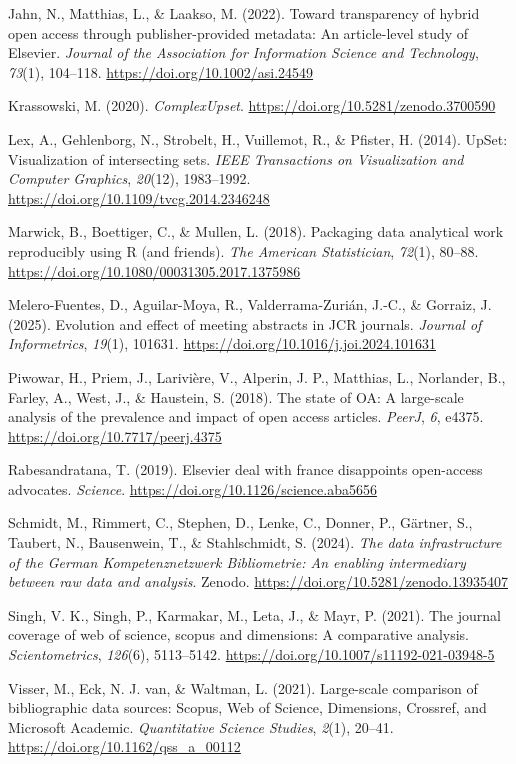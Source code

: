 \documentclass[a4paper,man,floatsintext,longtable,noextraspace,10pt]{apa6}
\newlength{\cslhangindent}
\newenvironment{CSLReferences}[2] %
{\begin{list}{}{%
  \setlength{\itemindent}{0pt}
  \setlength{\leftmargin}{0pt}
  \setlength{\parsep}{0pt}
  \ifodd #1
  \setlength{\leftmargin}{\cslhangindent}
  \setlength{\itemindent}{-1\cslhangindent}
  \fi
  \setlength{\itemsep}{#2\baselineskip}}}
{\end{list}}
\begin{document}
\begin{CSLReferences}{1}{0}
Jahn, N., Matthias, L., \& Laakso, M. (2022). Toward transparency of
hybrid open access through publisher-provided metadata: An article-level
study of {Elsevier}. \emph{Journal of the Association for Information
Science and Technology}, \emph{73}(1), 104--118.
\url{https://doi.org/10.1002/asi.24549}

Krassowski, M. (2020). \emph{ComplexUpset}.
\url{https://doi.org/10.5281/zenodo.3700590}

Lex, A., Gehlenborg, N., Strobelt, H., Vuillemot, R., \& Pfister, H.
(2014). UpSet: Visualization of intersecting sets. \emph{IEEE
Transactions on Visualization and Computer Graphics}, \emph{20}(12),
1983--1992. \url{https://doi.org/10.1109/tvcg.2014.2346248}

Marwick, B., Boettiger, C., \& Mullen, L. (2018). Packaging data
analytical work reproducibly using {R} (and friends). \emph{The American
Statistician}, \emph{72}(1), 80--88.
\url{https://doi.org/10.1080/00031305.2017.1375986}

Melero-Fuentes, D., Aguilar-Moya, R., Valderrama-Zurián, J.-C., \&
Gorraiz, J. (2025). Evolution and effect of meeting abstracts in JCR
journals. \emph{Journal of Informetrics}, \emph{19}(1), 101631.
\url{https://doi.org/10.1016/j.joi.2024.101631}

Piwowar, H., Priem, J., Larivière, V., Alperin, J. P., Matthias, L.,
Norlander, B., Farley, A., West, J., \& Haustein, S. (2018). The state
of {OA}: A large-scale analysis of the prevalence and impact of open
access articles. \emph{{PeerJ}}, \emph{6}, e4375.
\url{https://doi.org/10.7717/peerj.4375}

Rabesandratana, T. (2019). Elsevier deal with france disappoints
open-access advocates. \emph{Science}.
\url{https://doi.org/10.1126/science.aba5656}

Schmidt, M., Rimmert, C., Stephen, D., Lenke, C., Donner, P., Gärtner,
S., Taubert, N., Bausenwein, T., \& Stahlschmidt, S. (2024). \emph{The
data infrastructure of the {German Kompetenznetzwerk Bibliometrie}: An
enabling intermediary between raw data and analysis}. Zenodo.
\url{https://doi.org/10.5281/zenodo.13935407}

Singh, V. K., Singh, P., Karmakar, M., Leta, J., \& Mayr, P. (2021). The
journal coverage of web of science, scopus and dimensions: A comparative
analysis. \emph{Scientometrics}, \emph{126}(6), 5113--5142.
\url{https://doi.org/10.1007/s11192-021-03948-5}

Visser, M., Eck, N. J. van, \& Waltman, L. (2021). Large-scale
comparison of bibliographic data sources: {Scopus, Web of Science,
Dimensions, Crossref, and Microsoft Academic}. \emph{Quantitative
Science Studies}, \emph{2}(1), 20--41.
\url{https://doi.org/10.1162/qss_a_00112}

\end{CSLReferences}
\end{document}
